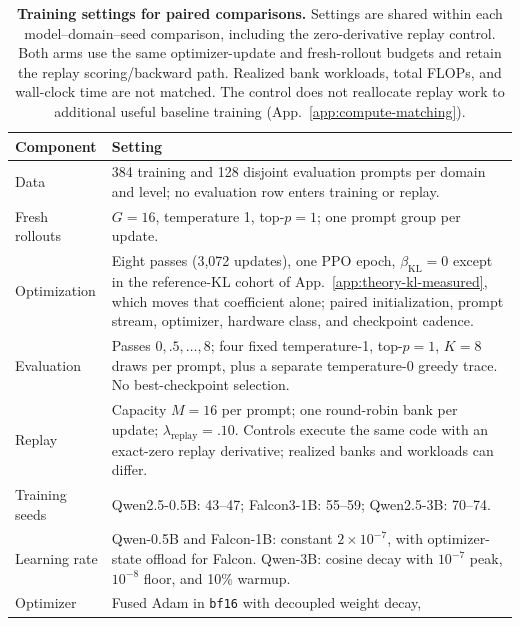\documentclass{article}
\newcommand{\1}{\mathbf 1}
\theoremstyle{remark}
\theoremstyle{definition}
\theoremstyle{plain}
\begin{document}
\begin{table}[!htbp]
  \centering
  \caption{\textbf{Training settings for paired comparisons.} Settings are
  shared within each model--domain--seed comparison, including the
  zero-derivative replay control. Both arms use the same optimizer-update and
  fresh-rollout budgets and retain the replay scoring/backward path. Realized
  bank workloads, total FLOPs, and wall-clock time are not matched. The control
  does not reallocate replay work to additional useful baseline training
  (App.~\ref{app:compute-matching}).}
  \label{tab:run-contract}
  \small
  \begin{tabularx}{\linewidth}{@{}P{.23\linewidth}Y@{}}
    \toprule
    \textbf{Component} & \textbf{Setting} \\
    \midrule
    Data & 384 training and 128 disjoint evaluation prompts per domain and
      level; no evaluation row enters training or replay. \\
    Fresh rollouts & $G=16$, temperature 1, top-$p=1$; one prompt group per update. \\
    Optimization & Eight passes (3,072 updates), one PPO epoch,
      $\beta_{\mathrm{KL}}=0$ except in the reference-KL cohort of
      App.~\ref{app:theory-kl-measured}, which moves that coefficient alone;
      paired initialization, prompt stream, optimizer, hardware class, and
      checkpoint cadence. \\
    Evaluation & Passes $0,.5,\ldots,8$; four fixed temperature-1,
      top-$p=1$, $K=8$ draws per prompt, plus a separate temperature-0
      greedy trace. No best-checkpoint selection. \\
    Replay & Capacity $M=16$ per prompt; one round-robin bank per update;
      $\lambda_{\mathrm{replay}}=.10$. Controls execute the same code with
      an exact-zero replay derivative; realized banks and workloads can differ. \\
    Training seeds & Qwen2.5-0.5B: 43--47; Falcon3-1B: 55--59;
      Qwen2.5-3B: 70--74. \\
    Learning rate & Qwen-0.5B and Falcon-1B: constant $2\times10^{-7}$,
      with optimizer-state offload for Falcon. Qwen-3B: cosine decay with
      $10^{-7}$ peak, $10^{-8}$ floor, and 10\% warmup. \\
    Optimizer & Fused Adam in \texttt{bf16} with decoupled weight decay,

\end{tabularx}
\end{table}
\end{document}

